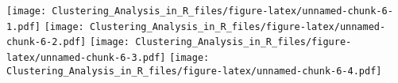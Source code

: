 \documentclass[]{article}
\begin{document}
\texttt{[image: Clustering\_Analysis\_in\_R\_files/figure-latex/unnamed-chunk-6-1.pdf]}
\texttt{[image: Clustering\_Analysis\_in\_R\_files/figure-latex/unnamed-chunk-6-2.pdf]}
\texttt{[image: Clustering\_Analysis\_in\_R\_files/figure-latex/unnamed-chunk-6-3.pdf]}
\texttt{[image: Clustering\_Analysis\_in\_R\_files/figure-latex/unnamed-chunk-6-4.pdf]}
\end{document}

